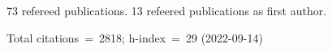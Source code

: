 73 refereed publications. 13 refeered publications as first author.

Total citations~=~2818; h-index~=~29 (2022-09-14)